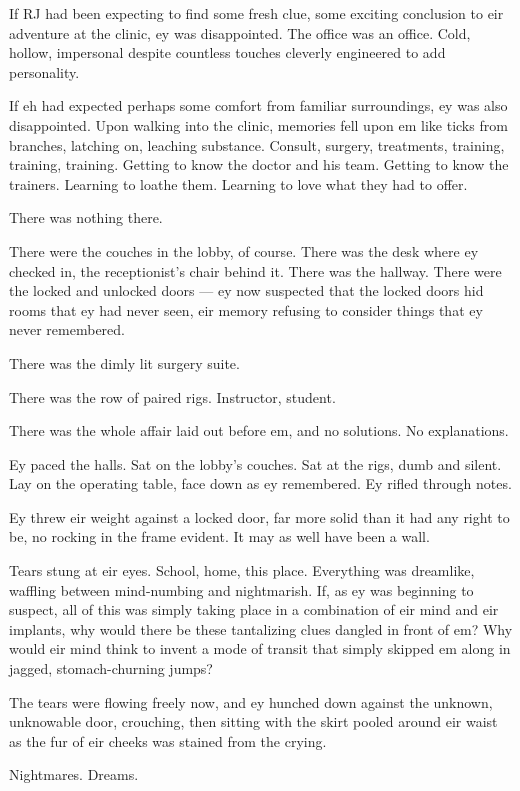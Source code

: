 If RJ had been expecting to find some fresh clue, some exciting conclusion to eir adventure at the clinic, ey was disappointed. The office was an office. Cold, hollow, impersonal despite countless touches cleverly engineered to add personality.

If eh had expected perhaps some comfort from familiar surroundings, ey was also disappointed. Upon walking into the clinic, memories fell upon em like ticks from branches, latching on, leaching substance. Consult, surgery, treatments, training, training, training. Getting to know the doctor and his team. Getting to know the trainers. Learning to loathe them. Learning to love what they had to offer.

There was nothing there.

There were the couches in the lobby, of course. There was the desk where ey checked in, the receptionist's chair behind it. There was the hallway. There were the locked and unlocked doors --- ey now suspected that the locked doors hid rooms that ey had never seen, eir memory refusing to consider things that ey never remembered.

There was the dimly lit surgery suite.

There was the row of paired rigs. Instructor, student.

There was the whole affair laid out before em, and no solutions. No explanations.

Ey paced the halls. Sat on the lobby's couches. Sat at the rigs, dumb and silent. Lay on the operating table, face down as ey remembered. Ey rifled through notes.

Ey threw eir weight against a locked door, far more solid than it had any right to be, no rocking in the frame evident. It may as well have been a wall.

Tears stung at eir eyes. School, home, this place. Everything was dreamlike, waffling between mind-numbing and nightmarish. If, as ey was beginning to suspect, all of this was simply taking place in a combination of eir mind and eir implants, why would there be these tantalizing clues dangled in front of em? Why would eir mind think to invent a mode of transit that simply skipped em along in jagged, stomach-churning jumps?

The tears were flowing freely now, and ey hunched down against the unknown, unknowable door, crouching, then sitting with the skirt pooled around eir waist as the fur of eir cheeks was stained from the crying.

Nightmares. Dreams.

